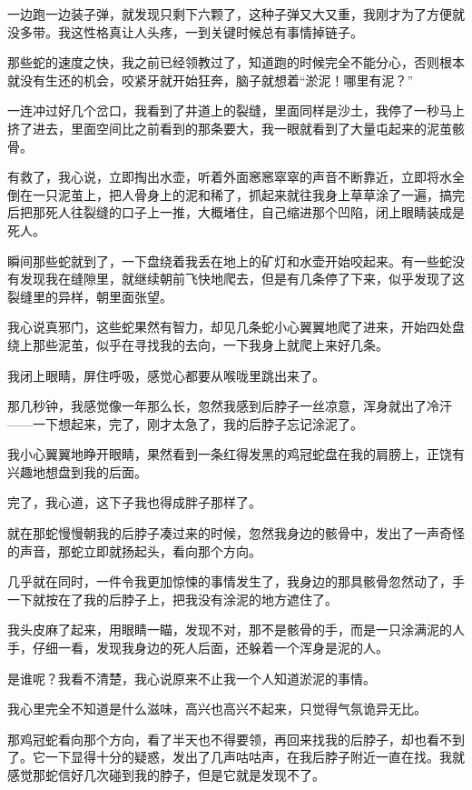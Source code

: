 一边跑一边装子弹，就发现只剩下六颗了，这种子弹又大又重，我刚才为了方便就没多带。我这性格真让人头疼，一到关键时候总有事情掉链子。

那些蛇的速度之快，我之前已经领教过了，知道跑的时候完全不能分心，否则根本就没有生还的机会，咬紧牙就开始狂奔，脑子就想着“淤泥！哪里有泥？”

一连冲过好几个岔口，我看到了井道上的裂缝，里面同样是沙土，我停了一秒马上挤了进去，里面空间比之前看到的那条要大，我一眼就看到了大量屯起来的泥茧骸骨。

有救了，我心说，立即掏出水壶，听着外面窸窸窣窣的声音不断靠近，立即将水全倒在一只泥茧上，把人骨身上的泥和稀了，抓起来就往我身上草草涂了一遍，搞完后把那死人往裂缝的口子上一推，大概堵住，自己缩进那个凹陷，闭上眼睛装成是死人。

瞬间那些蛇就到了，一下盘绕着我丢在地上的矿灯和水壶开始咬起来。有一些蛇没有发现我在缝隙里，就继续朝前飞快地爬去，但是有几条停了下来，似乎发现了这裂缝里的异样，朝里面张望。

我心说真邪门，这些蛇果然有智力，却见几条蛇小心翼翼地爬了进来，开始四处盘绕上那些泥茧，似乎在寻找我的去向，一下我身上就爬上来好几条。

我闭上眼睛，屏住呼吸，感觉心都要从喉咙里跳出来了。

那几秒钟，我感觉像一年那么长，忽然我感到后脖子一丝凉意，浑身就出了冷汗——一下想起来，完了，刚才太急了，我的后脖子忘记涂泥了。

我小心翼翼地睁开眼睛，果然看到一条红得发黑的鸡冠蛇盘在我的肩膀上，正饶有兴趣地想盘到我的后面。

完了，我心道，这下子我也得成胖子那样了。

就在那蛇慢慢朝我的后脖子凑过来的时候，忽然我身边的骸骨中，发出了一声奇怪的声音，那蛇立即就扬起头，看向那个方向。

几乎就在同时，一件令我更加惊悚的事情发生了，我身边的那具骸骨忽然动了，手一下就按在了我的后脖子上，把我没有涂泥的地方遮住了。

我头皮麻了起来，用眼睛一瞄，发现不对，那不是骸骨的手，而是一只涂满泥的人手，仔细一看，发现我身边的死人后面，还躲着一个浑身是泥的人。

是谁呢？我看不清楚，我心说原来不止我一个人知道淤泥的事情。

我心里完全不知道是什么滋味，高兴也高兴不起来，只觉得气氛诡异无比。

那鸡冠蛇看向那个方向，看了半天也不得要领，再回来找我的后脖子，却也看不到了。它一下显得十分的疑惑，发出了几声咕咕声，在我后脖子附近一直在找。我就感觉那蛇信好几次碰到我的脖子，但是它就是发现不了。

